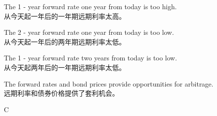 \documentclass{article}
\begin{document}
        \begin{choices}
            \item The 1 - year forward rate one year from today is too high.\\
            从今天起一年后的一年期远期利率太高。
            \item The 2 - year forward rate one year from today is too low.\\
            从今天起一年后的两年期远期利率太低。
            \item The 1 - year forward rate two years from today is too low.\\
            从今天起两年后的一年期远期利率太低。
            \item The forward rates and bond prices provide opportunities for arbitrage.\\
            远期利率和债券价格提供了套利机会。
        \end{choices}
        
        \begin{correctanswer}
        C
        \end{correctanswer}
        
\end{document}

